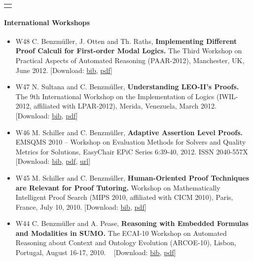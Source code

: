 \documentclass{article}
\newcommand{\tmstrong}[1]{\textbf{#1}}
\newenvironment{itemizedot}{\begin{itemize} \renewcommand{\labelitemi}{$\bullet$}\renewcommand{\labelitemii}{$\bullet$}\renewcommand{\labelitemiii}{$\bullet$}\renewcommand{\labelitemiv}{$\bullet$}}{\end{itemize}}
\begin{document}
{\noindent}\begin{tabular}{l}
  \hline
  \quad
\end{tabular}

\paragraph{International Workshops}

\begin{itemizedot}
  \item [W48] C. Benzm\"uller, J. Otten and Th. Raths, {\tmstrong{Implementing
  Different Proof Calculi for First-order Modal Logics.}} The Third Workshop
  on Practical Aspects of Automated Reasoning (PAAR-2012), Manchester, UK,
  June 2012. {\color{grey} [Download: {\small
  {\tmstrong{}}\href{../papers/W48.bib}{bib}}, {\small
  \href{../papers/W48.pdf}{pdf}}]}
  
  \item [W47] N. Sultana and C. Benzm\"uller, {\tmstrong{Understanding
  LEO-II's Proofs.}} The 9th International Workshop on the Implementation of
  Logics (IWIL-2012, affiliated with LPAR-2012), Merida, Venezuela, March
  2012. {\color{grey} [Download: {\small \href{../papers/W47.bib}{bib}},
  {\small \href{../papers/W47.pdf}{pdf}}]}
  
  \item [W46] M. Schiller and C. Benzm\"uller, {\tmstrong{Adaptive Assertion
  Level Proofs.}} EMSQMS 2010 -- Workshop on Evaluation Methods for Solvers
  and Quality Metrics for Solutions, EasyC{\tmstrong{}}hair EPiC Series
  6:39-40, 2012. ISSN 2040-557X {\tmstrong{}}{\color{grey} [Download: {\small
  \href{../papers/W46.bib}{bib}}, {\small \href{../papers/W46.pdf}{pdf}},
  {\small
  \href{http://www.easychair.org/publications/?page=1718758449}{url}}]}
  
  \item [W45] M. Schiller and C. Benzm\"uller, {\tmstrong{Human-Oriented Proof
  Techniques are Relevant for Proof Tutoring.}} Workshop on Mathematically
  Intelligent Proof Search (MIPS 2010, affiliated with CICM 2010), Paris,
  France, July 10, 2010. {\color{grey} [Download: {\small
  \href{../papers/W45.bib}{bib}}, {\small \href{../papers/W45.pdf}{pdf}}]}
  
  \item [W44] C. Benzm\"uller and A. Pease, {\tmstrong{Reasoning with Embedded
  Formulas and Modalities in SUMO.}} The ECAI-10 Workshop on Automated
  Reasoning about Context and Ontology Evolution (ARCOE-10), Lisbon, Portugal,
  August 16-17, 2010. \ {\color{grey} [Download: {\small
  \href{../papers/W44.bib}{bib}}, {\small \href{../papers/W44.pdf}{pdf}}]}
  

\end{itemizedot}
\end{document}
